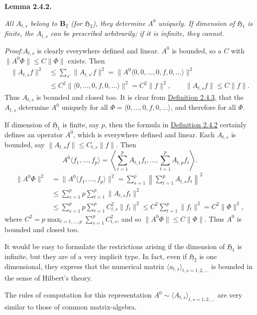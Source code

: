 \documentclass[12pt,b5paper,twoside]{article}
\newcommand{\Hspace}{\mathfrak H}
\newcommand{\B}{\mathbf B}
\newcommand{\Lemma}[1]{%
  \par\smallskip\noindent\phantomsection\label{lem:#1}\textbf{Lemma #1.}\enspace
}
\newcommand{\Proof}{\par\noindent\textit{Proof:}\enspace}
\newcommand{\defref}[1]{\hyperref[def:#1]{Definition #1}}
\begin{document}
\Lemma{2.4.2}
{\itshape
All $A_{t,s}$ belong to $\B_2$ (for $\Hspace_2$), they determine $A^0$
uniquely. If dimension of $\Hspace_1$ is finite, the $A_{t,s}$ can be
prescribed arbitrarily; if it is infinite, they cannot.}

\Proof $A_{t,s}$ is clearly everywhere defined and linear. $A^0$ is bounded,
so a $C$ with $\lVert A^0\Phi\rVert\leq C\lVert\Phi\rVert$ exists. Then
\begin{align*}
 \lVert A_{t,s}f\rVert^2
 &\leq\sum_{s'}\lVert A_{t,s'}f\rVert^2
  =\lVert A^0\langle0,0,\ldots,0,f,0,\ldots\rangle\rVert^2\\
 &\leq C^2\lVert\langle0,\ldots,0,f,0,\ldots\rangle\rVert^2
  =C^2\lVert f\rVert^2,
 \qquad \lVert A_{t,s}f\rVert\leq C\lVert f\rVert.
\end{align*}
Thus $A_{t,s}$ is bounded and closed too. It is clear from
\hyperref[def:2.4.2]{Definition 2.4.3},
that the $A_{t,s}$ determine $A^0$ uniquely for all
$\Phi=\langle0,\ldots,0,f,0,\ldots\rangle$, and therefore for all $\Phi$.

If dimension of $\Hspace_1$ is finite, say $p$, then the formula in
\defref{2.4.2} certainly defines an operator $A^0$, which is everywhere
defined and linear. Each $A_{t,s}$ is bounded, say
$\lVert A_{t,s}f\rVert\leq C_{t,s}\lVert f\rVert$. Then
\[
 A^0\langle f_1,\ldots,f_p\rangle
 =\left\langle\sum_{t=1}^{p}A_{t,1}f_t,\ldots,
                 \sum_{t=1}^{p}A_{t,p}f_t\right\rangle.
\]
\begin{align*}
 \lVert A^0\Phi\rVert^2
 &=\lVert A^0\langle f_1,\ldots,f_p\rangle\rVert^2
  =\sum_{s=1}^{p}\left\lVert\sum_{t=1}^{p}A_{t,s}f_t\right\rVert^2\\
 &\leq\sum_{s=1}^{p}p\sum_{t=1}^{p}\lVert A_{t,s}f_t\rVert^2\\
 &\leq\sum_{s=1}^{p}p\sum_{t=1}^{p}C_{t,s}^2\lVert f_t\rVert^2
  \leq C^2\sum_{t=1}^{p}\lVert f_t\rVert^2=C^2\lVert\Phi\rVert^2,
\end{align*}
where
$C^2=p\max_{t=1,\ldots,p}\sum_{s=1}^{p}C_{t,s}^2$, and so
$\lVert A^0\Phi\rVert\leq C\lVert\Phi\rVert$. Thus $A^0$ is bounded and
closed too.

It would be easy to formulate the restrictions arising if the dimension of
$\Hspace_1$ is infinite, but they are of a very implicit type. In fact, even
if $\Hspace_2$ is one dimensional, they express that the numerical matrix
$\langle a_{t,s}\rangle_{t,s=1,2,\ldots}$ is bounded in the sense of Hilbert's
theory.

The rules of computation for this representation
$A^0\sim\langle A_{t,s}\rangle_{t,s=1,2,\ldots}$ are very similar to those of
common matrix-algebra.
\end{document}
